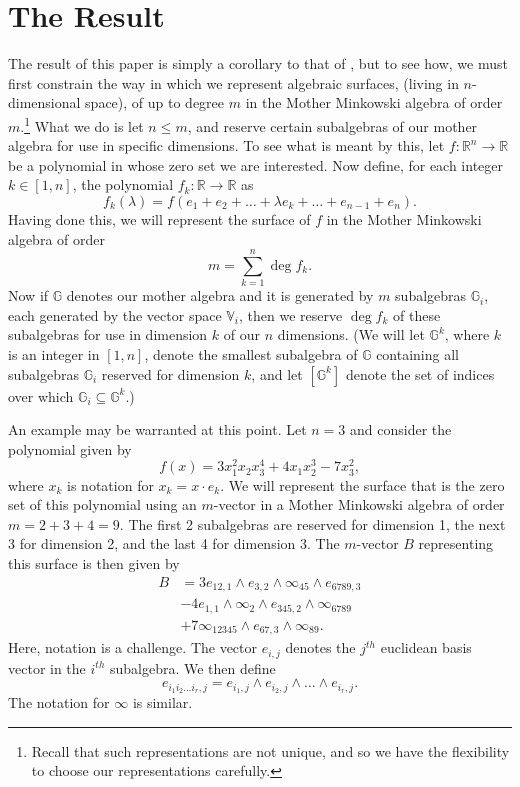 \documentclass{birkjour}
\theoremstyle{definition}
\theoremstyle{remark}
\numberwithin{equation}{section}
\newcommand{\R}{\mathbb{R}}
\newcommand{\G}{\mathbb{G}}
\newcommand{\V}{\mathbb{V}}
\newcommand{\nvai}{\infty}
\begin{document}
\section{The Result}

The result of this paper is simply a corollary to that of \cite{Parkin13}, but to see how,
we must first constrain the way in which we represent algebraic surfaces, (living in $n$-dimensional space), of up to degree $m$
in the Mother Minkowski algebra of order $m$.\footnote{Recall that such representations are not unique, and so
we have the flexibility to choose our representations carefully.} What we do is let $n\leq m$, and
reserve certain subalgebras of our mother algebra for use in specific dimensions.
To see what is meant by this, let $f:\R^n\to\R$ be a polynomial in whose zero set
we are interested.  Now define, for each integer $k\in[1,n]$, the polynomial $f_k:\R\to\R$ as
\begin{equation*}
f_k(\lambda)=f(e_1+e_2+\dots+\lambda e_k+\dots +e_{n-1}+e_n).
\end{equation*}
Having done this, we will represent the
surface of $f$ in the Mother Minkowski algebra of order
\begin{equation*}
m=\sum_{k=1}^n\deg f_k.
\end{equation*}
Now if $\G$ denotes our mother algebra and it is generated by $m$ subalgebras $\G_i$,
each generated by the vector space $\V_i$, then we reserve $\deg f_k$
of these subalgebras for use in dimension $k$ of our $n$ dimensions.
(We will let $\G^k$, where $k$ is an integer in $[1,n]$, denote the smallest
subalgebra of $\G$ containing all subalgebras $\G_i$ reserved for dimension $k$,
and let $[\G^k]$ denote the set of indices over which $\G_i\subseteq\G^k$.)

An example may be warranted at this point.  Let $n=3$ and consider the
polynomial given by
\begin{equation}\label{equ_example_poly}
f(x) = 3x_1^2x_2x_3^4 + 4x_1x_2^3 - 7x_3^2,
\end{equation}
where $x_k$ is notation for $x_k=x\cdot e_k$.  We will represent the
surface that is the zero set of this polynomial using an $m$-vector
in a Mother Minkowski algebra of order $m=2+3+4=9$.  The first
2 subalgebras are reserved for dimension 1, the next 3 for dimension
2, and the last 4 for dimension 3.  The $m$-vector $B$
representing this surface is then given by
\begin{align}
B &= 3e_{12,1}\wedge e_{3,2}\wedge \nvai_{45} \wedge e_{6789,3}\nonumber \\
 &- 4e_{1,1}\wedge\nvai_2\wedge e_{345,2}\wedge\nvai_{6789}\nonumber \\
 &+7\nvai_{12345}\wedge e_{67,3}\wedge\nvai_{89}.\label{equ_B_example}
\end{align}
Here, notation is a challenge.  The vector $e_{i,j}$ denotes the $j^{th}$ euclidean basis vector
in the $i^{th}$ subalgebra.  We then define
\begin{equation*}
e_{i_1i_2\dots i_r,j} = e_{i_1,j}\wedge e_{i_2,j}\wedge\dots\wedge e_{i_r,j}.
\end{equation*}
The notation for $\nvai$ is similar.
\end{document}
